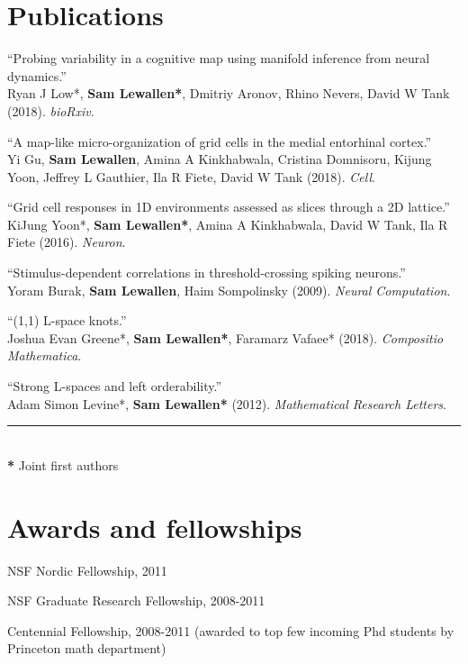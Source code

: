 \documentclass[letterpaper]{article}
\def\lsk{\\[.15em]}
\def\lskk{\\[-.9em]}
\renewenvironment{itemize}{
  \begin{list}{}{
    \setlength{\leftmargin}{1.5em}
  }
}{
  \end{list}
}
\begin{document}
\section*{Publications}
\begin{itemize}

\item ``Probing variability in a cognitive map using manifold inference from
neural dynamics.'' \lsk
Ryan J Low*, \textbf{Sam Lewallen*}, Dmitriy Aronov, Rhino Nevers, David W Tank
(2018). \emph{bioRxiv}.\lskk

\item ``A map-like micro-organization of grid cells in the medial entorhinal
cortex.'' \lsk
Yi Gu, \textbf{Sam Lewallen}, Amina A Kinkhabwala, Cristina Domnisoru, Kijung Yoon, Jeffrey L Gauthier, Ila R Fiete, David W Tank (2018). \emph{Cell}.\lskk

\item ``Grid cell responses in 1D environments assessed as slices through a 2D
lattice.'' \lsk
KiJung Yoon*, \textbf{Sam Lewallen*}, Amina A Kinkhabwala, David W Tank, Ila R
Fiete (2016). \emph{Neuron}.\lskk

\item ``Stimulus-dependent correlations in threshold-crossing spiking neurons.''  \lsk
Yoram Burak, \textbf{Sam Lewallen}, Haim Sompolinsky (2009). \emph{Neural
Computation}.\lskk

\item ``(1,1) L-space knots.'' \lsk
Joshua Evan Greene*, \textbf{Sam Lewallen*}, Faramarz Vafaee* (2018).
\emph{Compositio Mathematica}.\lskk

\item ``Strong L-spaces and left orderability.'' \lsk
Adam Simon Levine*, \textbf{Sam Lewallen*} (2012). \emph{Mathematical Research
Letters}.\lsk
\rule{0.5\linewidth}{\linethickness} \lsk
\textbf{*} Joint first authors \lsk
\end{itemize}

\section*{Awards and fellowships}

\begin{itemize}
\item NSF Nordic Fellowship, 2011 
\item NSF Graduate Research Fellowship, 2008-2011 
\item Centennial Fellowship, 2008-2011 (awarded to top few incoming Phd students by Princeton math department) 
\end{itemize}
\end{document}
